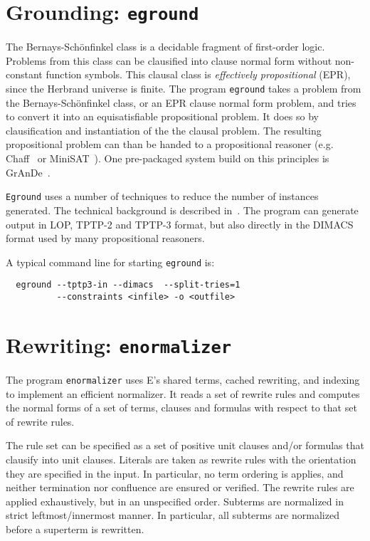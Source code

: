 \documentclass{report}
\begin{document}
\section{Grounding: \texttt{eground}}

The Bernays-Sch{\"o}nfinkel class is a decidable fragment of
first-order logic. Problems from this class can be clausified into
clause normal form without non-constant function symbols. This clausal
class is \emph{effectively propositional} (EPR), since the Herbrand
universe is finite. The program \texttt{eground} takes a problem from
the Bernays-Sch{\"o}nfinkel class, or an EPR clause normal form
problem, and tries to convert it into an equisatisfiable propositional
problem. It does so by clausification and instantiation of the the
clausal problem. The resulting propositional problem can than be
handed to a propositional reasoner (e.g. Chaff~\cite{MMZZM:DAC-2001}
or MiniSAT~\cite{ES:SAT-2004}). One pre-packaged system build on this
principles is GrAnDe~\cite{SS:CADE-2002}.

\texttt{Eground} uses a number of techniques to reduce the number of
instances generated. The technical background is described
in~\cite{Schulz:FLAIRS-2002}. The program can generate output in LOP,
TPTP-2 and TPTP-3 format, but also directly in the DIMACS format used
by many propositional reasoners.

A typical command line for starting \texttt{eground} is:

\begin{verbatim}
  eground --tptp3-in --dimacs  --split-tries=1
          --constraints <infile> -o <outfile>
\end{verbatim}


\section{Rewriting: \texttt{enormalizer}}

The program \texttt{enormalizer} uses E's shared terms, cached
rewriting, and indexing to implement an efficient normalizer. It reads
a set of rewrite rules and computes the normal forms of a set of
terms, clauses and formulas with respect to that set of rewrite rules.

The rule set can be specified as a set of positive unit clauses and/or
formulas that clausify into unit clauses. Literals are taken as
rewrite rules with the orientation they are specified in the input. In
particular, no term ordering is applies, and neither termination nor
confluence are ensured or verified. The rewrite rules are applied
exhaustively, but in an unspecified order. Subterms are normalized in
strict leftmost/innermost manner. In particular, all subterms are
normalized before a superterm is rewritten.
\end{document}

